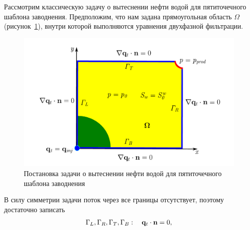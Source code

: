 Рассмотрим классическую задачу о вытеснении нефти водой для пятиточечного
шаблона заводнения. 
Предположим, что нам задана прямоугольная область $\Omega$ (рисунок~\ref{fig:ProblemInitBoundary}), 
внутри которой выполняются уравнения двухфазной фильтрации. 
\begin{figure}[H]
	\centering
	\includegraphics[width=1\linewidth]{img/Picture.pdf}
	\caption{Постановка задачи о вытеснении нефти водой для пятиточечного шаблона заводнения}
	\label{fig:ProblemInitBoundary}
\end{figure}

В силу симметрии задачи поток через все границы отсутствует, поэтому достаточно записать
\begin{equation}
	\Gamma_L, \Gamma_R, \Gamma_T, \Gamma_B: \quad \mathbf{q}_t \cdot \mathbf{n} = 0,
\end{equation}

